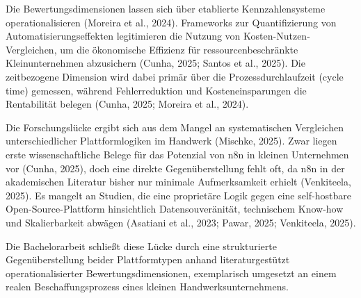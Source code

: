 ﻿\documentclass[a4paper,11pt]{article}
\begin{document}
Die Bewertungsdimensionen lassen sich über etablierte Kennzahlensysteme operationalisieren (Moreira et al., 2024). Frameworks zur Quantifizierung von Automatisierungseffekten legitimieren die Nutzung von Kosten-Nutzen-Vergleichen, um die ökonomische Effizienz für ressourcenbeschränkte Kleinunternehmen abzusichern (Cunha, 2025; Santos et al., 2025). Die zeitbezogene Dimension wird dabei primär über die Prozessdurchlaufzeit (cycle time) gemessen, während Fehlerreduktion und Kosteneinsparungen die Rentabilität belegen (Cunha, 2025; Moreira et al., 2024).

Die Forschungslücke ergibt sich aus dem Mangel an systematischen Vergleichen unterschiedlicher Plattformlogiken im Handwerk (Mischke, 2025). Zwar liegen erste wissenschaftliche Belege für das Potenzial von n8n in kleinen Unternehmen vor (Cunha, 2025), doch eine direkte Gegenüberstellung fehlt oft, da n8n in der akademischen Literatur bisher nur minimale Aufmerksamkeit erhielt (Venkiteela, 2025). Es mangelt an Studien, die eine proprietäre Logik gegen eine self-hostbare Open-Source-Plattform hinsichtlich Datensouveränität, technischem Know-how und Skalierbarkeit abwägen (Asatiani et al., 2023; Pawar, 2025; Venkiteela, 2025).

Die Bachelorarbeit schließt diese Lücke durch eine strukturierte Gegenüberstellung beider Plattformtypen anhand literaturgestützt operationalisierter Bewertungsdimensionen, exemplarisch umgesetzt an einem realen Beschaffungsprozess eines kleinen Handwerksunternehmens.
\end{document}
